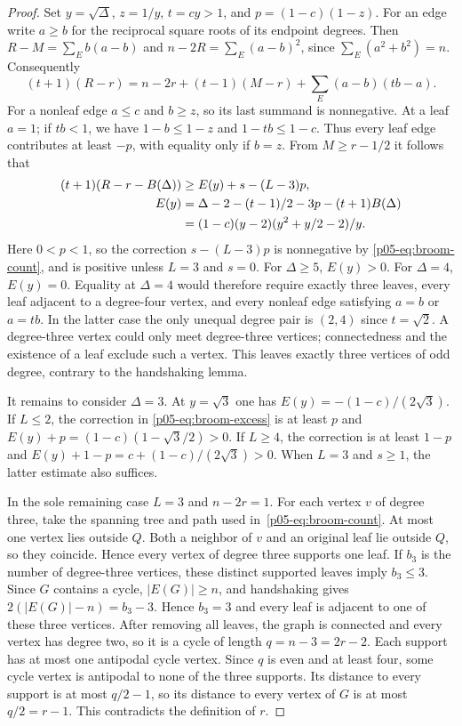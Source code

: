 \documentclass[11pt,a4paper]{article}
\begin{document}
\begin{proof}
Set $y=\sqrt{\Delta}$, $z=1/y$, $t=cy>1$, and $p=(1-c)(1-z)$.
For an edge write $a\ge b$ for the reciprocal square roots of its endpoint
degrees. Then $R-M=\sum_{E}b(a-b)$ and $n-2R=\sum_{E}(a-b)^2$, since
$\sum_{E}(a^2+b^2)=n$. Consequently
\[
 (t+1)(R-r)= n-2r+(t-1)(M-r)+\sum_{E}(a-b)(tb-a).
\]
For a nonleaf edge $a\le c$ and $b\ge z$, so its last summand is
nonnegative. At a leaf $a=1$; if $tb<1$, we have $1-b\le1-z$
and $1-tb\le1-c$. Thus every leaf edge contributes at least $-p$,
with equality only if $b=z$. From $M\ge r-1/2$ it follows that
\begin{align}
 (t+1)(R-r-B(\Delta))&\ge E(y)+s-(L-3)p,\label{p05-eq:broom-excess}\\
 E(y)&=\Delta-2-(t-1)/2-3p-(t+1)B(\Delta)\notag\\
 &= (1-c)(y-2)(y^2+y/2-2)/y.\notag
\end{align}
Here $0<p<1$, so the correction $s-(L-3)p$ is nonnegative by
\eqref{p05-eq:broom-count}, and is positive unless $L=3$ and $s=0$.
For $\Delta\ge5$, $E(y)>0$. For $\Delta=4$, $E(y)=0$. Equality at $\Delta=4$ would
therefore require exactly three leaves, every leaf adjacent to a
degree-four vertex, and every nonleaf edge satisfying $a=b$ or $a=tb$.
In the latter case the only unequal degree pair is $(2,4)$ since $t=\sqrt2$.
A degree-three vertex could only meet degree-three vertices; connectedness
and the existence of a leaf exclude such a vertex. This leaves exactly
three vertices of odd degree, contrary to the handshaking lemma.

It remains to consider $\Delta=3$. At $y=\sqrt3$ one has
$E(y)=-(1-c)/(2\sqrt3)$. If $L\le2$, the correction in
\eqref{p05-eq:broom-excess} is at least $p$ and
$E(y)+p=(1-c)(1-\sqrt3/2)>0$. If $L\ge4$, the correction is at least
$1-p$ and $E(y)+1-p=c+(1-c)/(2\sqrt3)>0$. When $L=3$ and $s\ge1$,
the latter estimate also suffices.

In the sole remaining case $L=3$ and $n-2r=1$. For each vertex $v$ of
degree three, take the spanning tree and path used in~\eqref{p05-eq:broom-count}.
At most one vertex lies outside $Q$. Both a neighbor of $v$ and an
original leaf lie outside $Q$, so they coincide. Hence every vertex of
degree three supports one leaf. If $b_3$ is the number of degree-three
vertices, these distinct supported leaves imply
$b_3\le3$. Since $G$ contains a cycle, $|E(G)|\ge n$, and handshaking
gives $2(|E(G)|-n)=b_3-3$. Hence $b_3=3$ and every leaf is adjacent to
one of these three vertices. After removing all leaves, the graph is
connected and every vertex has degree two, so it is a cycle of length
$q=n-3=2r-2$. Each support has at most one antipodal cycle vertex.
Since $q$ is even and at least four, some cycle vertex is antipodal to
none of the three supports. Its distance to every support is at most
$q/2-1$, so its distance to every vertex of $G$ is at most $q/2=r-1$.
This contradicts the definition of $r$.
\end{proof}
\end{document}
